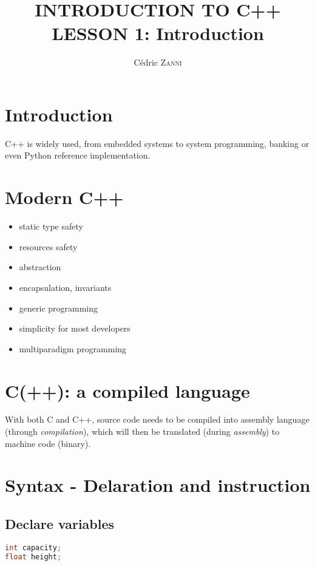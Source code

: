 \documentclass[11pt]{article}
\begin{document}
    \title{\small INTRODUCTION TO C++ \\ \LARGE LESSON 1: Introduction}
    \author{Cédric \textsc{Zanni}}

    \maketitle

    \section{Introduction}

    C++ is widely used, from embedded systems to system programming, banking or even Python reference implementation.

    \section{Modern C++}

    \begin{itemize}
        \item static type safety
        \item resources safety
        \item abstraction
        \item encapsulation, invariants
        \item generic programming
        \item simplicity for most developers
        \item multiparadigm programming
    \end{itemize}

    \section{C(++): a compiled language}

    With both C and C++, source code needs to be compiled into assembly language (through \textit{compilation}), which will then be translated (during \textit{assembly}) to machine code (binary).

    \section{Syntax - Delaration and instruction}

    \subsection{Declare variables}
    \begin{lstlisting}[language=C]
int capacity;
float height;
    \end{lstlisting}
\end{document}
